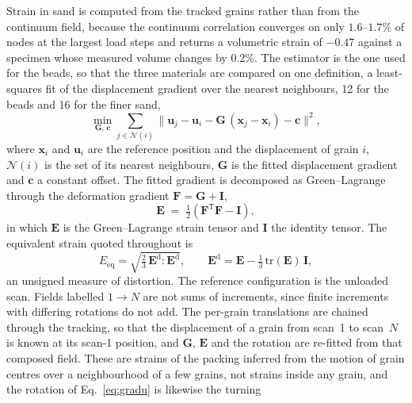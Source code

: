 \documentclass[preprint,12pt,numbers]{elsarticle}
\begin{document}
  Strain in sand is computed from the tracked grains rather than from the
  continuum field, because the continuum correlation converges on only
  $1.6$--$1.7\%$ of nodes at the largest load steps and returns a volumetric
  strain of $-0.47$ against a specimen whose measured volume changes by $0.2\%$.
  The estimator is the one used for the beads, so that the three materials
  are compared on one definition, a least-squares fit of the displacement
  gradient over the nearest neighbours, 12 for the beads and 16 for the finer
  sand,
  \begin{equation}
    \min_{\mathbf{G},\,\mathbf{c}} \sum_{j\in\mathcal{N}(i)}
      \bigl\| \mathbf{u}_j - \mathbf{u}_i
              - \mathbf{G}\,(\mathbf{x}_j - \mathbf{x}_i) - \mathbf{c} \bigr\|^2 ,
    \label{eq:gradu}
  \end{equation}
  where $\mathbf{x}_i$ and $\mathbf{u}_i$ are the reference position and the
  displacement of grain $i$, $\mathcal{N}(i)$ is the set of its nearest
  neighbours, $\mathbf{G}$ is the fitted displacement gradient and $\mathbf{c}$
  a constant offset.  The fitted gradient is decomposed as Green--Lagrange
  through the deformation gradient $\mathbf{F} = \mathbf{G} + \mathbf{I}$,
  \begin{equation}
    \mathbf{E} \;=\; \tfrac{1}{2}\!\left(\mathbf{F}^{\mathsf{T}}\mathbf{F}
                     - \mathbf{I}\right),
    \label{eq:greenlagrange}
  \end{equation}
  in which $\mathbf{E}$ is the Green--Lagrange strain tensor and $\mathbf{I}$
  the identity tensor.  The equivalent strain quoted throughout is
  \begin{equation}
    E_\mathrm{eq} = \sqrt{\tfrac{2}{3}\,\mathbf{E}^{\mathrm{d}}\!:\!\mathbf{E}^{\mathrm{d}}},
    \qquad
    \mathbf{E}^{\mathrm{d}} = \mathbf{E} - \tfrac13\,\mathrm{tr}(\mathbf{E})\,\mathbf{I},
    \label{eq:eqstrain}
  \end{equation}
  an unsigned measure of distortion.  The reference configuration is the
  unloaded scan.  Fields labelled $1\!\to\!N$ are not sums of increments,
  since finite increments with differing rotations do not add.  The per-grain
  translations are chained through the tracking, so that the displacement of
  a grain from scan~1 to scan~$N$ is known at its scan-1 position, and
  $\mathbf{G}$, $\mathbf{E}$ and the rotation are re-fitted from that
  composed field.  These are strains of the packing inferred from the motion
  of grain centres over a neighbourhood of a few grains, not strains inside
  any grain, and the rotation of Eq.~\eqref{eq:gradu} is likewise the turning
\end{document}
